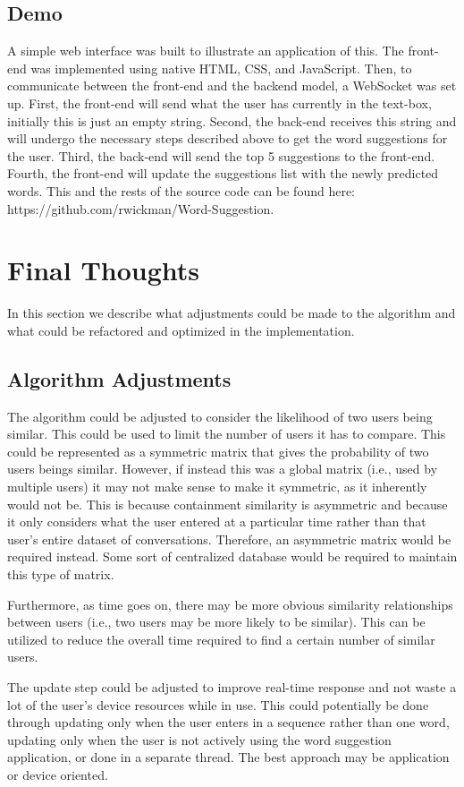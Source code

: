 \documentclass[sigconf]{acmart}
\begin{document}
\subsection{Demo}
A simple web interface was built to illustrate an application of this. The front-end was implemented using native HTML, CSS, and JavaScript. Then, to communicate between the front-end and the backend model, a WebSocket was set up. First, the front-end will send what the user has currently in the text-box, initially this is just an empty string. Second, the back-end receives this string and will undergo the necessary steps described above to get the word suggestions for the user. Third, the back-end will send the top 5 suggestions to the front-end. Fourth, the front-end will update the suggestions list with the newly predicted words.  This and the rests of the source code can be found here: https://github.com/rwickman/Word-Suggestion.

\section{Final Thoughts}
In this section we describe what adjustments could be made to the algorithm and what could be refactored and optimized in the implementation.
\subsection{Algorithm Adjustments}
The algorithm could be adjusted to consider the likelihood of two users being similar. This could be used to limit the number of users it has to compare. This could be represented as a symmetric matrix that gives the probability of two users beings similar. However, if instead this was a global matrix (i.e., used by multiple users) it may not make sense to make it symmetric, as it inherently would not be. This is because containment similarity is asymmetric and because it only considers what the user entered at a particular time rather than that user’s entire dataset of conversations. Therefore, an asymmetric matrix would be required instead. Some sort of centralized database would be required to maintain this type of matrix. 

Furthermore, as time goes on, there may be more obvious similarity relationships between users (i.e., two users may be more likely to be similar). This can be utilized to reduce the overall time required to find a certain number of similar users. 

The update step could be adjusted to improve real-time response and not waste a lot of the user’s device resources while in use. This could potentially be done through updating only when the user enters in a sequence rather than one word, updating only when the user is not actively using the word suggestion application, or done in a separate thread. The best approach may be application or device oriented.
\end{document}
